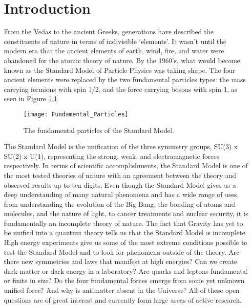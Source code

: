 \chapter{Introduction} \label{ch:introduction}

From the Vedas to the ancient Greeks, generations have described the constituents of nature in terms of indivisible `elements'.  It wasn't until the modern era that the ancient elements of earth, wind, fire, and water were abandoned for the atomic theory of nature.  By the 1960's, what would become known as the Standard Model of Particle Physics was taking shape.  The four ancient elements were replaced by the two fundamental particles types: the mass carrying fermions with spin 1/2, and the force carrying bosons with spin 1, as seen in Figure \ref{fig:fundpart}.


\begin{figure}[h]
\texttt{[image: Fundamental\_Particles]}
\centering
\caption{The fundamental particles of the Standard Model\cite{Patrignani:2016xqp}.}
\label{fig:fundpart}
\end{figure}


\par
The Standard Model is the unification of the three symmetry groups, SU(3) x SU(2) x U(1), representing the strong, weak, and electromagnetic forces respectively\cite{Langacker:2009my}.  In terms of scientific accomplishments, the Standard Model is one of the most tested theories of nature with an agreement between the theory and observed results up to ten digits\cite{Aoyama:2014sxa}.  Even though the Standard Model gives us a deep understanding of many natural phenomena and has a wide range of uses, from understanding the evolution of the Big Bang, the bonding of atoms and molecules, and the nature of light, to cancer treatments and nuclear security, it is fundamentally an incomplete theory of nature.  The fact that Gravity has yet to be unified into a quantum theory tells us that the Standard Model is incomplete.  High energy experiments give us some of the most extreme conditions possible to test the Standard Model and to look for phenomena outside of the theory.  Are there new symmetries and laws that manifest at high energies? Can we create dark matter or dark energy in a laboratory?  Are quarks and leptons fundamental or finite in size?  Do the four fundamental forces emerge from some yet unknown unified force?  And why is antimatter absent in the Universe?  All of these open questions are of great interest and currently form large areas of active research.  


